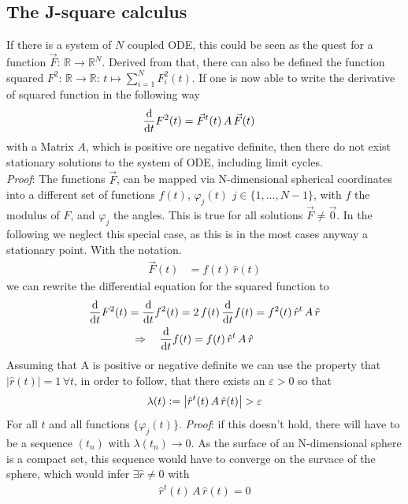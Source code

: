 \documentclass{article}
\begin{document}
\begin{appendices}
\section{The J-square calculus}
\label{appendix:msq_calc}
If there is a system of $N$ coupled ODE, this could be seen as the quest for a function $\vec{F}:\,\mathbb{R}\rightarrow\mathbb{R}^N$. Derived from that, there can also be defined the function squared $F^2:\,\mathbb{R}\rightarrow\mathbb{R}:\,t\mapsto\sum_{i=1}^NF_i^2(t)$. If one is now able to write the derivative of squared function in the following way
\begin{align*}
    \frac{\text{d}}{\text{d}t} F^2(t)&=\vec{F}^t(t)\,A\,\vec{F}(t)
\end{align*}
with a Matrix $A$, which is positive ore negative definite, then there do not exist stationary solutions to the system of ODE, including limit cycles. \\
\textit{Proof}: The functions $\vec{F}$, can be mapped via N-dimensional spherical coordinates into a different set of functions $f(t)$, $\varphi_j(t)$ $j\in\{1,\dots,N-1\}$, with $f$ the modulus of $F$, and $\varphi_j$ the angles. This is true for all solutions $\vec{F}\neq\vec{0}$. In the following we neglect this special case, as this is in the most cases anyway a stationary point. With the notation.
\begin{align*}
    \vec{F}(t)&=f(t)\,\hat{r}(t)
\end{align*}
we can rewrite the differential equation for the squared function to
\begin{align*}
    \frac{\text{d}}{\text{d}t} F^2(t)=\frac{\text{d}}{\text{d}t} f^2(t)=2\,f(t)\,\frac{\text{d}}{\text{d}t} f(t)&=f^2(t)\,\hat{r}^t\,A\,\hat{r}\\
    \Rightarrow\quad\frac{\text{d}}{\text{d}t} f(t) = f(t)\,\hat{r}^t\,A\,\hat{r}
\end{align*}
Assuming that A is positive or negative definite we can use the property that $|\hat{r}(t)|=1\,\forall t$, in order to follow, that there exists an $\varepsilon>0$ so that
\begin{align*}
    \lambda(t)\vcentcolon=\left| \hat{r}^t(t)\,A\,\hat{r}(t) \right| > \varepsilon
\end{align*}
For all $t$ and all functions $\{\varphi_j(t)\}$. \textit{Proof}: if this doesn't hold, there will have to be a sequence $(t_n)$ with $\lambda(t_n)\rightarrow0$. As the surface of an N-dimensional sphere is a compact set, this sequence would have to converge on the survace of the sphere, which would infer $\exists \hat{r}\neq0$ with 
\begin{align*}
    \hat{r}^t(t)\,A\,\hat{r}(t)=0

\end{align*}
\end{appendices}
\end{document}
